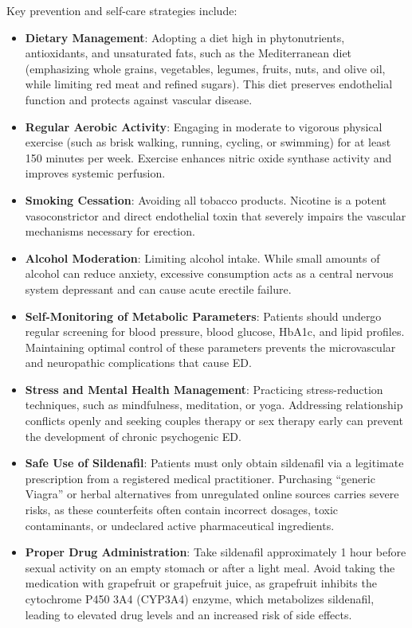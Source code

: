 Key prevention and self-care strategies include:
\begin{itemize}
    \item \textbf{Dietary Management}: Adopting a diet high in phytonutrients, antioxidants, and unsaturated fats, such as the Mediterranean diet (emphasizing whole grains, vegetables, legumes, fruits, nuts, and olive oil, while limiting red meat and refined sugars). This diet preserves endothelial function and protects against vascular disease.
    \item \textbf{Regular Aerobic Activity}: Engaging in moderate to vigorous physical exercise (such as brisk walking, running, cycling, or swimming) for at least 150 minutes per week. Exercise enhances nitric oxide synthase activity and improves systemic perfusion.
    \item \textbf{Smoking Cessation}: Avoiding all tobacco products. Nicotine is a potent vasoconstrictor and direct endothelial toxin that severely impairs the vascular mechanisms necessary for erection.
    \item \textbf{Alcohol Moderation}: Limiting alcohol intake. While small amounts of alcohol can reduce anxiety, excessive consumption acts as a central nervous system depressant and can cause acute erectile failure.
    \item \textbf{Self-Monitoring of Metabolic Parameters}: Patients should undergo regular screening for blood pressure, blood glucose, HbA1c, and lipid profiles. Maintaining optimal control of these parameters prevents the microvascular and neuropathic complications that cause ED.
    \item \textbf{Stress and Mental Health Management}: Practicing stress-reduction techniques, such as mindfulness, meditation, or yoga. Addressing relationship conflicts openly and seeking couples therapy or sex therapy early can prevent the development of chronic psychogenic ED.
    \item \textbf{Safe Use of Sildenafil}: Patients must only obtain sildenafil via a legitimate prescription from a registered medical practitioner. Purchasing ``generic Viagra'' or herbal alternatives from unregulated online sources carries severe risks, as these counterfeits often contain incorrect dosages, toxic contaminants, or undeclared active pharmaceutical ingredients.
    \item \textbf{Proper Drug Administration}: Take sildenafil approximately 1 hour before sexual activity on an empty stomach or after a light meal. Avoid taking the medication with grapefruit or grapefruit juice, as grapefruit inhibits the cytochrome P450 3A4 (CYP3A4) enzyme, which metabolizes sildenafil, leading to elevated drug levels and an increased risk of side effects.
\end{itemize}

